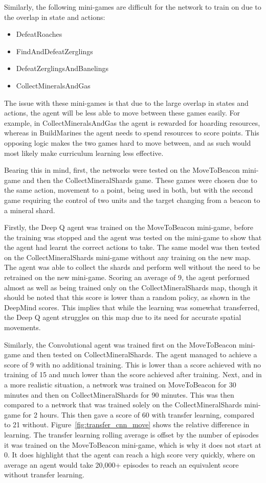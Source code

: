 Similarly, the following mini-games are difficult for the network to train on
due to the overlap in state and actions:

\begin{itemize}
    \item DefeatRoaches
    \item FindAndDefeatZerglings
    \item DefeatZerglingsAndBanelings
    \item CollectMineralsAndGas
\end{itemize}

The issue with these mini-games is that due to the large overlap in states and
actions, the agent will be less able to move between these games easily. For
example, in CollectMineralsAndGas the agent is rewarded for hoarding resources,
whereas in BuildMarines the agent needs to spend resources to score points. This
opposing logic makes the two games hard to move between, and as such would most
likely make curriculum learning less effective.

Bearing this in mind, first, the networks were tested on the MoveToBeacon
mini-game and then the CollectMineralShards game. These games were chosen due to
the same action, movement to a point, being used in both, but with the second
game requiring the control of two units and the target changing from a beacon to
a mineral shard.

Firstly, the Deep Q agent was trained on the MoveToBeacon mini-game, before the
training was stopped and the agent was tested on the mini-game to show that the
agent had learnt the correct actions to take. The same model was then tested on
the CollectMineralShards mini-game without any training on the new map. The
agent was able to collect the shards and perform well without the need to be
retrained on the new mini-game. Scoring an average of 9, the agent performed
almost as well as being trained only on the CollectMineralShards map, though it
should be noted that this score is lower than a random policy, as shown in the
DeepMind scores. This implies that while the learning was somewhat transferred,
the Deep Q agent struggles on this map due to its need for accurate spatial
movements.

Similarly, the Convolutional agent was trained first on the MoveToBeacon
mini-game and then tested on CollectMineralShards. The agent managed to achieve
a score of 9 with no additional training. This is lower than a score achieved
with no training of 15 and much lower than the score achieved after training.
Next, and in a more realistic situation, a network was trained on MoveToBeacon
for 30 minutes and then on CollectMineralShards for 90 minutes. This was then
compared to a network that was trained solely on the CollectMineralShards
mini-game for 2 hours. This then gave a score of 60 with transfer learning,
compared to 21 without. Figure~\ref{fig:transfer_cnn_move} shows the relative
difference in learning. The transfer learning rolling average is offset by the
number of episodes it was trained on the MoveToBeacon mini-game, which is why it
does not start at 0. It does highlight that the agent can reach a high
score very quickly, where on average an agent would take 20,000+ episodes to
reach an equivalent score without transfer learning.

